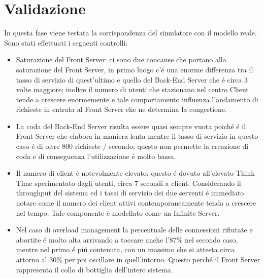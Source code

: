 \chapter{Validazione} 

In questa fase viene testata la corrispondenza del simulatore con il modello reale. Sono stati effettuati i seguenti controlli:

\begin{itemize}
 \item Saturazione del Front Server: ci sono due concause che portano alla saturazione del Front Server, in primo luogo c'\'e una enorme differenza tra il tasso di servizio di quest'ultimo e quello del Back-End Server che \'e circa 3 volte maggiore; inoltre il numero di utenti che stazionano nel centro Client tende a crescere enormemente e tale comportamento influenza l'andamento di richieste in entrata al Front Server che ne determina la congestione.
 
 \item La coda del Back-End Server risulta essere quasi sempre vuota poich\'e \'e il Front Server che elabora in maniera lenta mentre il tasso di servizio in questo caso \'e di oltre 800 richieste / secondo; questo non permette la creazione di coda e di conseguenza l'utilizzazione \'e molto bassa.
 
 \item Il numero di client \'e notevolmente elevato: questo \'e dovuto all'elevato Think Time sperimentato dagli utenti, circa 7 secondi a client. Considerando il throughput del sistema ed i tassi di servizio dei due serventi \'e immediato notare come il numero dei client attivi contemporaneamente tenda a crescere nel tempo. Tale componente è modellato come un Infinite Server.
 
 \item Nel caso di overload management la percentuale delle connessioni rifiutate e abortite \'e molto alta arrivando a toccare anche l'87\% nel secondo caso, mentre nel primo \'e pi\'u contenuta, con un massimo che si attesta circa attorno al 30\% per poi oscillare in quell'intorno. Questo perch\'e il Front Server rappresenta il collo di bottiglia dell'intero sistema.
\end{itemize}